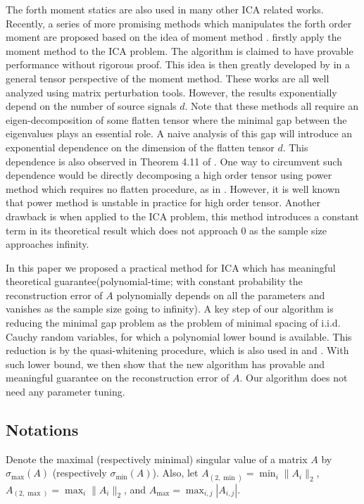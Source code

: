 \documentclass[twoside]{article}
\theoremstyle{definition}
\begin{document}
The forth moment statics are also used in many other ICA related works. 
Recently, a series of more promising methods which manipulates the forth order moment are proposed based on the idea of moment method \citep{hsu2013learning,anandkumar2012tensordecomposition,anandkumar2012method}. 
\citep{hsu2013learning} firstly apply the moment method to the ICA problem. The algorithm is claimed to have provable performance without rigorous proof. 
This idea is then greatly developed by \citep{anandkumar2012tensordecomposition,anandkumar2012method,goyal2014fourier} in a general tensor perspective of the moment method. 
These works are all well analyzed using matrix perturbation tools. 
However, the results exponentially depend on the number of source signals $d$.
Note that these methods all require an eigen-decomposition of some flatten tensor where the minimal gap between the eigenvalues plays an essential role. 
A naive analysis of this gap will introduce an exponential dependence on the dimension of the flatten tensor $d$. 
This dependence is also observed in Theorem 4.11 of \citep{goyal2014fourier}.
One way to circumvent such dependence would be directly decomposing a high order tensor using power method which requires no flatten procedure, as in \citep{anandkumar2014guaranteed}. 
However, it is well known that power method is unstable in practice for high order tensor. 
Another drawback is when applied to the ICA problem, this method introduces a constant term in its theoretical result which does not approach 0 as the sample size approaches infinity. 

In this paper we proposed a practical method for ICA which has meaningful theoretical guarantee(polynomial-time; with constant probability the reconstruction error of $A$ polynomially depends on all the parameters and vanishes as the sample size going to infinity).      
A key step of our algorithm is reducing the minimal gap problem as the problem of minimal spacing of i.i.d. Cauchy random variables, for which a polynomial lower bound is available.
This reduction is by the quasi-whitening procedure, which is also used in \citep{frieze1996learning} and \citep{arora2012provable}.
With such lower bound, we then show that the new algorithm has provable and meaningful guarantee on the reconstruction error of $A$. 
Our algorithm does not need any parameter tuning.

\subsection{Notations}
Denote the maximal (respectively minimal) singular value of a matrix $A$ by  $\sigma_{\max}(A)$ (respectively $\sigma_{\min}(A)$). Also, let $A_{(2,\min)} = \min_{i} \|A_i\|_2$, $A_{(2,\max)} = \max_{i} \|A_i\|_2$, and $A_{\max} = \max_{i,j} |A_{i,j}|$.
\end{document}
